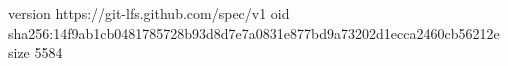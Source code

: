 version https://git-lfs.github.com/spec/v1
oid sha256:14f9ab1cb0481785728b93d8d7e7a0831e877bd9a73202d1ecca2460cb56212e
size 5584
